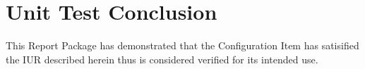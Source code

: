 \newpage
\section{Unit Test Conclusion}
This Report Package has demonstrated that the Configuration Item has satisified
the IUR described herein thus is considered verified for its intended use.
